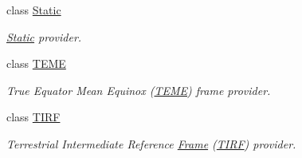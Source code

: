 \begin{DoxyCompactItemize}
class \hyperlink{classlibrary_1_1physics_1_1coord_1_1frame_1_1provider_1_1_static}{Static}
\begin{DoxyCompactList}\small\item\em \hyperlink{classlibrary_1_1physics_1_1coord_1_1frame_1_1provider_1_1_static}{Static} provider. \end{DoxyCompactList}\item 
class \hyperlink{classlibrary_1_1physics_1_1coord_1_1frame_1_1provider_1_1_t_e_m_e}{T\+E\+ME}
\begin{DoxyCompactList}\small\item\em True Equator Mean Equinox (\hyperlink{classlibrary_1_1physics_1_1coord_1_1frame_1_1provider_1_1_t_e_m_e}{T\+E\+ME}) frame provider. \end{DoxyCompactList}\item 
class \hyperlink{classlibrary_1_1physics_1_1coord_1_1frame_1_1provider_1_1_t_i_r_f}{T\+I\+RF}
\begin{DoxyCompactList}\small\item\em Terrestrial Intermediate Reference \hyperlink{classlibrary_1_1physics_1_1coord_1_1_frame}{Frame} (\hyperlink{classlibrary_1_1physics_1_1coord_1_1frame_1_1provider_1_1_t_i_r_f}{T\+I\+RF}) provider. \end{DoxyCompactList}\end{DoxyCompactItemize}
